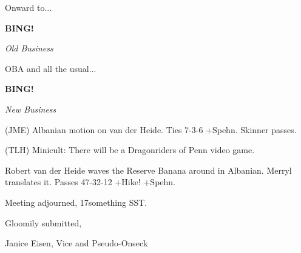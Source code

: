 \documentclass[12pt]{article}
\newcommand{\bing}{{\bf BING!} }
\newcommand{\goto}[1]{\bing \vskip 12pt \centerline{{\em{#1}}}}
\begin{document}
Onward to...

\goto{Old Business}

OBA and all the usual...

\goto{New Business}

(JME) Albanian motion on van der Heide. Ties 7-3-6 +Spehn. Skinner passes.

(TLH) Minicult: There will be a Dragonriders of Penn video game.

Robert van der Heide waves the Reserve Banana around in Albanian. Merryl translates it. Passes 47-32-12 +Hike! +Spehn.

\vspace{12pt}

\noindent
Meeting adjourned, 17something SST.

\vspace{18pt}

\centerline{Gloomily submitted,}
\centerline{Janice Eisen, Vice and Pseudo-Onseck}
\end{document}
